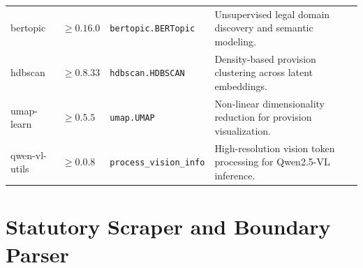 \begin{table}[htbp]
\begin{tabularx}{\linewidth}{>{\RaggedRight\arraybackslash\ttfamily}p{2.8cm}>{\centering\arraybackslash}p{1.4cm}>{\RaggedRight\arraybackslash}p{3.8cm}>{\RaggedRight\arraybackslash}X}
        bertopic & $\ge 0.16.0$ & \texttt{bertopic.BERTopic} & Unsupervised legal domain discovery and semantic modeling. \\
        hdbscan & $\ge 0.8.33$ & \texttt{hdbscan.HDBSCAN} & Density-based provision clustering across latent embeddings. \\
        umap-learn & $\ge 0.5.5$ & \texttt{umap.UMAP} & Non-linear dimensionality reduction for provision visualization. \\
        qwen-vl-utils & $\ge 0.0.8$ & \texttt{process\_vision\_info} & High-resolution vision token processing for Qwen2.5-VL inference. \\
        \bottomrule
    \end{tabularx}
\end{table}

\clearpage
\section{Statutory Scraper and Boundary Parser}
\label{sec:app_code_scraping}


